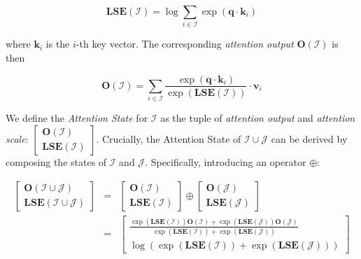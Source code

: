 \begin{equation}
    \mathbf{LSE}(\mathcal{I}) = \log \sum_{i \in \mathcal{I}} \exp(\mathbf{q} \cdot \mathbf{k}_i)
\end{equation}

where \(\mathbf{k}_i\) is the \(i\)-th key vector. The corresponding \emph{attention output} \(\mathbf{O}(\mathcal{I})\) is then


\begin{equation}
    \mathbf{O}(\mathcal{I}) = \sum_{i \in \mathcal{I}} \frac{\exp(\mathbf{q} \cdot \mathbf{k}_i)}{\exp(\mathbf{LSE}(\mathcal{I}))} \cdot \mathbf{v}_i
\end{equation}

We define the \emph{Attention State} for \(\mathcal{I}\) as the tuple of \emph{attention output} and \emph{attention scale}:
\(\begin{bmatrix}\mathbf{O}(\mathcal{I}) \\ \mathbf{LSE}(\mathcal{I}) \end{bmatrix}\). Crucially, the Attention State of \(\mathcal{I}\cup\mathcal{J}\) can be derived by composing the states of \(\mathcal{I}\) and \(\mathcal{J}\). Specifically, introducing an operator \(\oplus\):

\vspace{-1em}
\begin{eqnarray*}
   \begin{bmatrix} \mathbf{O}(\mathcal{I \cup J}) \\ \mathbf{LSE}(\mathcal{I \cup J}) \end{bmatrix} & \!\!\!\!\!\!=\!\!\!\!\!\! &
    \begin{bmatrix} \mathbf{O}(\mathcal{I}) \\ \mathbf{LSE}(\mathcal{I}) \end{bmatrix} \oplus \begin{bmatrix} \mathbf{O}(\mathcal{J}) \\ \mathbf{LSE}(\mathcal{J}) \end{bmatrix} \\ \ & \!\!\!\!\!\! = \!\!\!\!\!\! & 
    \begin{bmatrix} 
        \frac{\exp(\mathbf{LSE}(\mathcal{I})) \mathbf{O}(\mathcal{I}) + \exp(\mathbf{LSE}(\mathcal{J})) \mathbf{O}(\mathcal{J})}{\exp(\mathbf{LSE}(\mathcal{I})) + \exp(\mathbf{LSE}(\mathcal{J}))}
        \\ \log(\exp(\mathbf{LSE}(\mathcal{I})) + \exp(\mathbf{LSE}(\mathcal{J}))) \end{bmatrix}
\end{eqnarray*}
\vspace{-1em}


